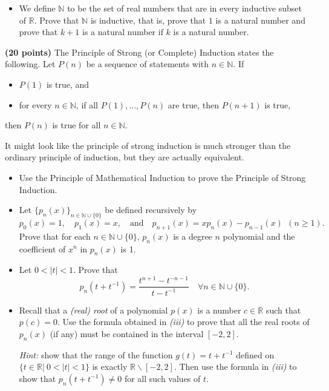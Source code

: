 \documentclass[11pt, oneside,usenames,dvipsnames]{article}
\begin{document}
{\begin{itemize}
	\item[\it(iii)] We define $\mathbb N$ to be the set of real numbers that are in every inductive subset of $\mathbb{R}$. Prove that $\mathbb{N}$ is inductive, that is, prove that $1$ is a natural number and prove that $k+1$ is a natural number if $k$ is a natural number.
\end{itemize}



\medskip

 {\bf (20 points)}
The Principle of Strong (or Complete) Induction states the following. Let $P(n)$ be a sequence of statements with $n \in \mathbb{N}$. If
\begin{itemize}
	\item[\it (a)] $P(1)$ is true, and 
	\item[\it (b)] for every $n \in \mathbb{N}$, if all $P(1), \dots, P(n)$ are true, then $P(n+1)$ is true,
\end{itemize}
then $P(n)$ is true for all $n \in \mathbb{N}.$

\smallskip

{\color{blue} It might look like the principle of strong induction is much stronger than the ordinary principle of induction, but they are actually equivalent.}

\begin{itemize}
	\item[\it (i)] Use the Principle of Mathematical Induction to prove the Principle of Strong Induction.
	\item[\it(ii)]  Let $\{p_n(x)\}_{n \in \mathbb{N} \cup\{0\}}$ be defined recursively by
	$$
	p_0(x) = 1,\quad  p_1(x) = x, \quad \text{and}\quad  p_{n+1}(x) = x p_n(x) - p_{n-1}(x) \ \ (n \geq 1).
	$$
	Prove that for each $n \in \mathbb{N} \cup\{0\}$, $p_n(x)$ is a degree $n$ polynomial and the coefficient of $x^n$ in $p_n(x)$ is 1.
	\item[\it(iii)] Let $0 < |t| < 1$.  Prove that
	$$p_n(t+t^{-1}) = \frac{t^{n+1}- t^{-n-1}}{t-t^{-1}} \quad \forall  n \in \mathbb{N} \cup\{0\}.
	$$
	\item[\it(iv)]  Recall that a {\it (real) root} of a polynomial $p(x)$ is a number $c \in \mathbb R$ such that $p(c) = 0$.  Use the formula obtained in {\it(iii)} to prove that all the real roots of $p_n(x)$ (if any) must be contained in the interval $[-2,2]$.
	
	{\it Hint:} show that the range of the function $g(t) = t+t^{-1}$ defined on $\{t \in \mathbb R \big| \ 0 <|t| < 1\}$ is exactly $\mathbb R \backslash [-2,2]$. Then use the formula in {\it (iii)} to show that $p_n(t+t^{-1}) \ne 0$ for all such values of $t$. 


\end{itemize}}
\end{document}
